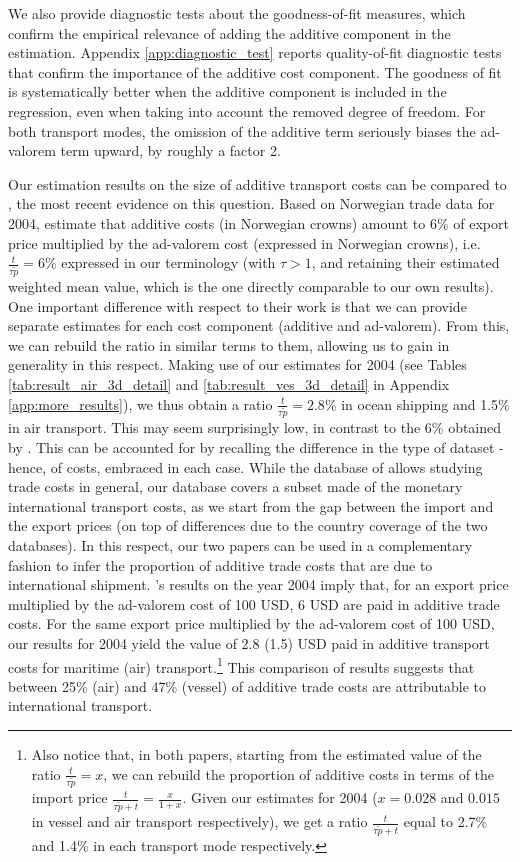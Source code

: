 \documentclass[a4paper,11pt]{article}
\begin{document}
We also provide diagnostic tests about the goodness-of-fit measures, which confirm the empirical relevance of adding the additive component in the estimation. Appendix \ref{app:diagnostic_test} reports quality-of-fit diagnostic tests that confirm the importance of the additive cost component.
The goodness of fit is systematically better when the additive component is included in the regression, even when taking into account the removed degree of freedom. For both transport modes, the omission of the additive term seriously biases the ad-valorem term upward, by roughly a factor 2.\smallskip


Our estimation results on the size of additive transport costs can be compared to \cite{Irrazabal_2015}, the most recent evidence on this question.
Based on Norwegian trade data for 2004, \cite{Irrazabal_2015} estimate that additive costs (in Norwegian crowns) amount to 6\% of export price multiplied by the ad-valorem cost (expressed in Norwegian crowns), i.e.
$\frac{t}{\tau\widetilde{p}}=6\%$ expressed in our terminology (with $\tau>1$, and retaining their estimated weighted mean value, which is the one directly comparable to our own results).
One important difference with respect to their work is that we can provide separate estimates for each cost component (additive and ad-valorem).
From this, we can rebuild the ratio in similar terms to them, allowing us to gain in generality in this respect.
Making use of our estimates for 2004 (see Tables \ref{tab:result_air_3d_detail} and \ref{tab:result_ves_3d_detail} in Appendix \ref{app:more_results}), we thus obtain a ratio $\frac{t}{\tau\widetilde{p}}=2.8\%$ in ocean shipping and 1.5\% in air transport.
This may seem surprisingly low, in contrast to the 6\% obtained by \cite{Irrazabal_2015}.
This can be accounted for by recalling the difference in the type of dataset - hence, of costs, embraced in each case.
While the database of \cite{Irrazabal_2015} allows studying trade costs in general, our database covers a subset made of the monetary international transport costs, as we start from the gap between the import and the export prices (on top of differences due to the country coverage of the two databases).
In this respect, our two papers can be used in a complementary fashion to infer the proportion of additive trade costs that are due to international shipment.
\cite{Irrazabal_2015}'s results on the year 2004 imply that, for an export price multiplied by the ad-valorem cost of 100 USD, 6 USD are paid in additive trade costs.
For the same export price multiplied by the ad-valorem cost of 100 USD, our results for 2004 yield the value of 2.8 (1.5) USD paid in additive transport costs for maritime (air) transport.\footnote{Also notice that, in both papers, starting from the estimated value of the ratio $\frac{t}{\tau \widetilde{p}}= x$, we can rebuild the proportion of additive costs in terms of the import price $\frac{t}{\tau \widetilde{p} + t} = \frac{x}{1+x}$.
Given our estimates for 2004 ($x = 0.028$ and $0.015$ in vessel and air transport respectively), we get a ratio $\frac{t}{\tau \widetilde{p} + t}$ equal to 2.7\% and 1.4\% in each transport mode respectively.} This comparison of results suggests that between 25\% (air) and 47\% (vessel) of additive trade costs are attributable to international transport.
\end{document}
